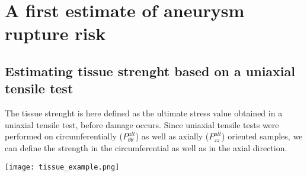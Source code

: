 \documentclass[../conclusions.tex]{subfiles}
\begin{document}
    
\section{A first estimate of aneurysm rupture risk}

\subsection{Estimating tissue strenght based on a uniaxial tensile test}

The tissue strenght is here defined as the ultimate stress value obtained in a uniaxial tensile test, before damage occurs. Since uniaxial 
tensile tests were performed on circumferentially ($P^{ult}_{\theta\theta}$) as well as axially ($P^{ult}_{zz}$) oriented samples, we can define the strength 
in the circumferential as well as in the axial direction.  

\texttt{[image: tissue\_example.png]}
\end{document}

